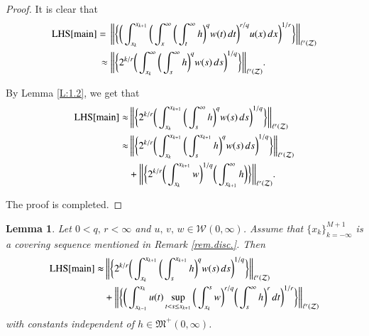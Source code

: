 \documentclass[12pt]{amsart}
\theoremstyle{plain}
\newtheorem{lem}[thm]{Lemma}
\theoremstyle{definition}
\numberwithin{thm}{section}
\numberwithin{equation}{section}
\begin{document}
\begin{proof}
	It is clear that
	\begin{align*}
	{\operatorname{LHS}}{\eqref{main}} & = \, \bigg\| \bigg\{ \bigg(\int_{x_k}^{x_{k+1}} \bigg( \int_x^{\infty} \bigg( \int_t^{\infty} h \bigg)^q w(t)\,dt \bigg)^{r / q} u(x)\,dx \bigg)^{1/r} \bigg\} \bigg\|_{\ell^r({\mathcal Z})} \\
	& \, \approx \bigg\| \bigg\{ 2^{k / r} \bigg( \int_{x_k}^{\infty}	\bigg( \int_s^{\infty} h \bigg)^q w(s)\,ds\bigg)^{ 1 / q} \bigg\} \bigg\|_{\ell^r({\mathcal Z})}.
	\end{align*}

By Lemma \ref{L:1.2}, we get that
	\begin{align*}
	{\operatorname{LHS}}{\eqref{main}}  \approx & \, \bigg\| \bigg\{ 2^{k / r} \bigg( \int_{x_k}^{x_{k+1}}	\bigg( \int_s^{\infty} h \bigg)^q w(s)\,ds\bigg)^{ 1 / q} \bigg\} \bigg\|_{\ell^r({\mathcal Z})} \\
	\approx & \, \bigg\| \bigg\{ 2^{k / r} \bigg( \int_{x_k}^{x_{k+1}}	\bigg( \int_s^{x_{k + 1}} h \bigg)^q w(s)\,ds\bigg)^{ 1 / q} \bigg\} \bigg\|_{\ell^r({\mathcal Z})} \\
	& + \bigg\| \bigg\{ 2^{k / r} \bigg( \int_{x_k}^{x_{k+1}} w \bigg)^{1 / q} \bigg( \int_{x_{k+1}}^{\infty} h \bigg) \bigg\} \bigg\|_{\ell^r({\mathcal Z})}.
	\end{align*}
	
The proof is completed. 
\end{proof}

\begin{lem}\label{lem.1.2}
	Let $0 < q,\, r < \infty$ and  $u,\,v,\,w \in {\mathcal W}{(0,\infty)}$.
	Assume that $\{x_k\}_{k=-\infty}^{M + 1}$ is a covering sequence mentioned in Remark \ref{rem.disc.}. Then
	\begin{align}
	{\operatorname{LHS}}{\eqref{main}} \thickapprox &  \, \bigg\| \bigg\{ 2^{k / r} \bigg(
	\int_{x_k}^{x_{k+1}} \bigg( \int_s^{x_{k+1}} h \bigg)^q
	w(s)\,ds\bigg)^{ 1 / q} \bigg\} \bigg\|_{\ell^r({\mathcal Z})} \notag \\
	&  +  \bigg\| \bigg\{ \bigg( \int_{x_{k-1}}^{x_k} u(t) \sup_{t < s \le x_{k+1}} \bigg(
	\int_{x_k}^s w \bigg)^{r / q} \bigg( \int_s^{\infty} h
	\bigg)^r \,dt\bigg)^{1/r} \bigg\} \bigg\|_{\ell^r({\mathcal Z})}
	\end{align}
	with constants independent of $h \in {\mathfrak M}^+(0,\infty)$.
\end{lem}
\end{document}
